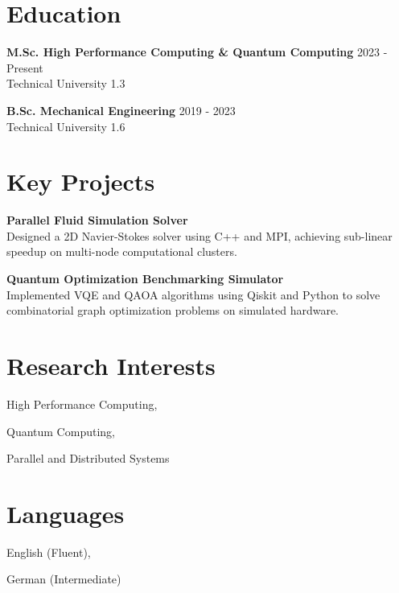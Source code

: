 \documentclass[11pt,a4paper]{article}
\begin{document}
\section{Education}

\textbf{ M.Sc. High Performance Computing & Quantum Computing } \hfill 2023 - Present\\
Technical University \hfill 1.3

\textbf{ B.Sc. Mechanical Engineering } \hfill 2019 - 2023\\
Technical University \hfill 1.6


\section{Key Projects}

\textbf{ Parallel Fluid Simulation Solver }\\
Designed a 2D Navier-Stokes solver using C++ and MPI, achieving sub-linear speedup on multi-node computational clusters.

\textbf{ Quantum Optimization Benchmarking Simulator }\\
Implemented VQE and QAOA algorithms using Qiskit and Python to solve combinatorial graph optimization problems on simulated hardware.


\section{Research Interests}

High Performance Computing, 

Quantum Computing, 

Parallel and Distributed Systems


\section{Languages}

English (Fluent), 

German (Intermediate)
\end{document}
